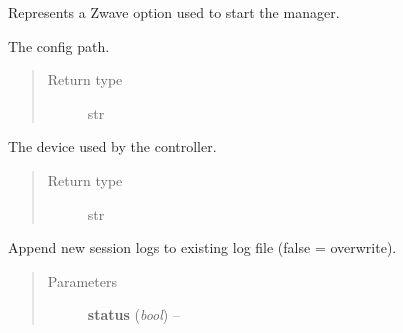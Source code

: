 \documentclass[letterpaper,10pt,english]{sphinxmanual}
\begin{document}
\begin{fulllineitems}
\label{option:openzwave.option.ZWaveOption}
Represents a Zwave option used to start the manager.

\begin{fulllineitems}
\label{option:openzwave.option.ZWaveOption.config_path}
The config path.
\begin{quote}\begin{description}
\item[{Return type}] \leavevmode
str

\end{description}\end{quote}

\end{fulllineitems}


\begin{fulllineitems}
\label{option:openzwave.option.ZWaveOption.device}
The device used by the controller.
\begin{quote}\begin{description}
\item[{Return type}] \leavevmode
str

\end{description}\end{quote}

\end{fulllineitems}


\begin{fulllineitems}
\label{option:openzwave.option.ZWaveOption.set_append_log_file}
Append new session logs to existing log file (false = overwrite).
\begin{quote}\begin{description}
\item[{Parameters}] \leavevmode
\textbf{status} (\emph{bool}) -- 

\end{description}\end{quote}


\end{fulllineitems}
\end{fulllineitems}
\end{document}
